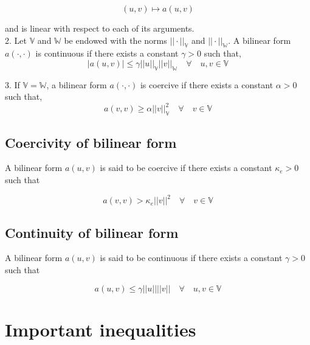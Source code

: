\documentclass[a4paper]{book}
\begin{document}
\begin{equation}
(u,v) \mapsto a(u,v)
\end{equation}

and is linear with respect to each of its arguments.\\

2. Let $\mathbb{V}$ and $\mathbb{W}$ be endowed with the norms $||\cdot||_\mathbb{V}$ and $||\cdot||_\mathbb{W}$. A bilinear form $a(\cdot,\cdot)$ is continuous if there exists a constant $\gamma > 0$ such that,
\begin{equation}
|a(u,v)| \leq \gamma ||u||_\mathbb{V} ||v||_\mathbb{W} \quad \forall \quad u,v \in \mathbb{V}
\end{equation}

3. If $\mathbb{V} = \mathbb{W}$, a bilinear form $a(\cdot,\cdot)$ is coercive if there exists a constant $\alpha > 0$ such that,
\begin{equation}
a(v,v) \geq \alpha ||v||_\mathbb{V}^2  \quad \forall \quad v \in  \mathbb{V}
\end{equation}

\subsection{Coercivity of bilinear form} \label{Coercivity_constant}

A bilinear form $a(u,v)$ is said to be coercive if there exists a constant $\kappa_e > 0$ such that

\begin{equation}\label{Coercivity}
a(v,v) > \kappa_e ||v||^2   \quad \forall \quad v \in  \mathbb{V}
\end{equation}

\subsection{Continuity of bilinear form}

A bilinear form $a(u,v)$ is said to be continuous if there exists a constant $\gamma > 0$ such that

\begin{equation}\label{Continuity_constant}
a(u,v) \leq \gamma ||u||||v|| \quad  \forall \quad u,v \in  \mathbb{V}
\end{equation}

\section{Important inequalities}
\end{document}
